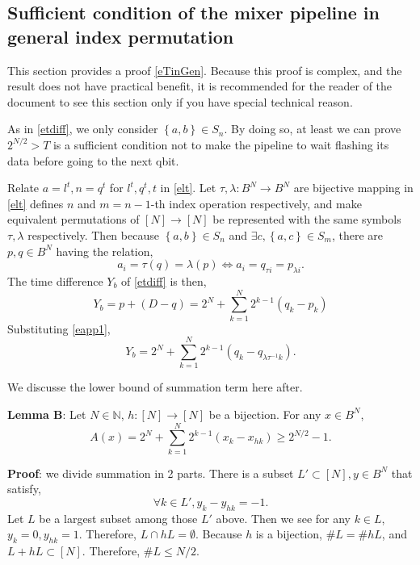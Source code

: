 \documentclass[a4paper]{article}
\newcommand{\eqlabel}[1]{\label{#1}}
\newcommand{\cbr}[1]{\left\{#1\right\}}
\newcommand{\sN}{\mathbb{N}}
\begin{document}
\subsection{Sufficient condition of the mixer pipeline in general index permutation}
\label{sMinGen}
This section provides a proof \eqref{eTinGen}. Because this proof is complex, and the result does not have practical benefit, it is recommended for the reader of the document to see this section only if you have special technical reason.

As in \eqref{etdiff}, we only consider \(\cbr{a, b}\in S_n\). By doing so, at least we can prove \(2^{N/2} > T\) is a sufficient condition not to make the pipeline to wait flashing its data before going to the next qbit.  

Relate \(a = l^t, n = q^t\) for \(l^t, q^t, t\) in \eqref{elt}. Let \(\tau, \lambda: B^N\to B^N\) are bijective mapping in \eqref{elt} defines \(n\) and \(m=n-1\)-th index operation respectively,  and make equivalent permutations of \([N]\to [N]\) be represented with the same symbols \(\tau, \lambda\) respectively. Then because \(\cbr{a, b}\in S_n\) and \(\exists c, \cbr{a, c}\in S_m\), there are \(p, q\in B^N\) having the relation,
\begin{equation}
    \eqlabel{eapp1}
 a_i = \tau(q) = \lambda(p) \Leftrightarrow a_i = q_{\tau i} = p_{\lambda i}. 
\end{equation}
The time difference \(Y_b\) of \eqref{etdiff} is then,
\[
Y_b = p + (D - q) = 2^{N} + \sum_{k=1}^N 2^{k-1}(q_k - p_k)
\]
Substituting \eqref{eapp1},
\[
Y_b = 2^{N} + \sum_{k=1}^N 2^{k-1}(q_k - q_{\lambda \tau^{-1} k}) .
\]

We discusse the lower bound of summation term here after.

\textbf{Lemma B}: Let \(N\in\sN\), \(h:[N]\to [N]\) be a bijection. For any \(x\in B^N\), 
\begin{equation}
\eqlabel{eLB}
A(x) = 2^N + \sum_{k=1}^N 2^{k-1} (x_k - x_{hk}) \geq 2^{N/2 } - 1.
\end{equation}

\textbf{Proof}: we divide summation in 2 parts. There is a subset \(L'\subset[N], y\in B^N\) that satisfy,
\[
    \forall k\in L', y_k - y_{h k} = -1.
\] 
Let \(L\) be a largest subset among those \(L'\) above. 
Then we see for any \(k\in L\), \(y_k = 0, y_{hk} = 1\). Therefore, \(L \cap h L = \emptyset\). Because \(h\) is a bijection, \(\# L = \# hL\), and \(L + h L \subset [N]\). Therefore, \(\# L \leq N/2\). 
\end{document}
